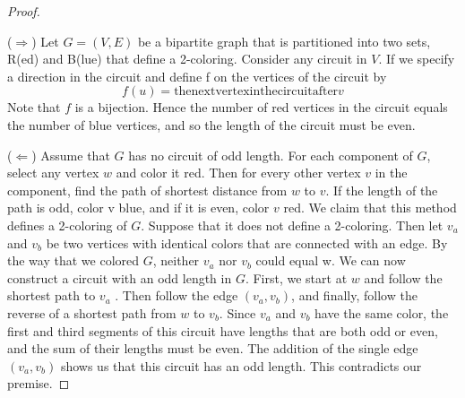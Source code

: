 \documentclass[10pt,]{book}
\theoremstyle{plain}
\theoremstyle{definition}
\theoremstyle{definition}
\theoremstyle{definition}
\theoremstyle{definition}
\theoremstyle{definition}
\numberwithin{equation}{section}
\begin{document}
\begin{proof}\hypertarget{proof-9}{}
(\(\Rightarrow\)) Let \(G = (V, E)\) be a bipartite graph that is partitioned into two sets,  R(ed) and  B(lue) that define
a 2-coloring. Consider any circuit in \(V\). If we specify a direction in the circuit and define  f on the vertices of the circuit
by 
\[f(u) = \text{the} \text{next} \text{vertex} \text{in} \text{the} \text{circuit} \text{after} v\]
Note that \(f\) is a bijection. Hence the number of red vertices in the circuit equals the number of blue vertices, and so the length of the
circuit must be even.%
\par
(\(\Longleftarrow\)) Assume that \(G\) has no circuit of odd length. For each component of \(G\), select any vertex \(w\) and color
it red. Then for every other vertex \(v\) in the component, find the path of shortest distance from \(w\) to \(v\). If the length
of the path is odd, color v blue, and if it is even, color \(v\) red. We claim that this method defines a 2-coloring of \(G\). Suppose
that it does not define a 2-coloring. Then let \(v_a\) and \(v_b\) be two vertices with identical colors that are connected with an edge. By the
way that we colored \(G\), neither \(v_a\) nor \(v_{b }\) could equal  w.  We can now construct a circuit with an odd length
in \(G\). First, we start at \(w\) and follow the shortest path to \(v_a\) . Then follow the edge \(\left(v_a,v_b\right)\), and finally,
follow the reverse of a shortest path from \(w\) to \(v_b\). Since \(v_a\) and \(v_b\) have the same color, the first and third segments of
this circuit have lengths that are both odd or even, and the sum of their lengths must be even. The addition of the single edge \(\left(v_a,v_b\right)\)
shows us that this circuit has an odd length. This contradicts our premise.%
\end{proof}
\typeout{************************************************}
\typeout{************************************************}
\end{document}
